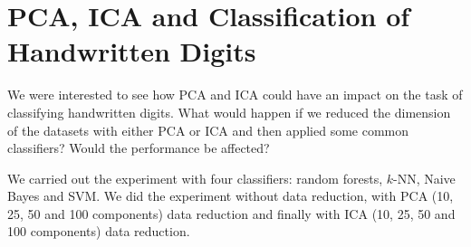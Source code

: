 \documentclass[12pt,article,oneside]{memoir}
\begin{document}
\section{PCA, ICA and Classification of Handwritten Digits}

We were interested to see how PCA and ICA could have an impact on the task of classifying handwritten digits. What would happen if we reduced the dimension of the datasets with either PCA or ICA and then applied some common classifiers? Would the performance be affected?

We carried out the experiment with four classifiers: random forests, $k$-NN, Naive Bayes and SVM. We did the experiment without data reduction, with PCA (10, 25, 50 and 100 components) data reduction and finally with ICA (10, 25, 50 and 100 components) data reduction.
\end{document}
